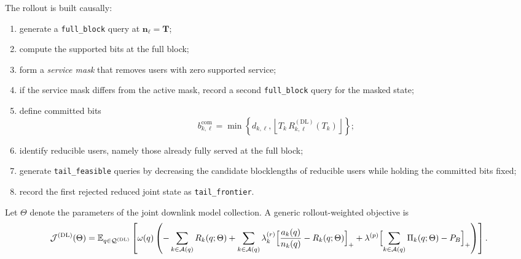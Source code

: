 \documentclass[11pt]{article}
\newcommand{\Aset}{\mathcal{A}}
\newcommand{\Qset}{\mathcal{Q}}
\newcommand{\floor}[1]{\left\lfloor #1 \right\rfloor}
\newcommand{\DL}{\mathrm{DL}}
\newcommand{\E}{\mathbb{E}}
\begin{document}
The rollout is built causally:
\begin{enumerate}
    \item generate a \texttt{full\_block} query at $\mathbf n_\ell=\mathbf T$;
    \item compute the supported bits at the full block;
    \item form a \emph{service mask} that removes users with zero supported service;
    \item if the service mask differs from the active mask, record a second
    \texttt{full\_block} query for the masked state;
    \item define committed bits
    \begin{equation}
    b_{k,\ell}^{\mathrm{com}}
    =
    \min\!\left\{
    d_{k,\ell},
    \floor{T_k\,R_{k,\ell}^{(\DL)}(T_k)}
    \right\};
    \label{eq:dl-committed-bits}
    \end{equation}
    \item identify reducible users, namely those already fully served at the
    full block;
    \item generate \texttt{tail\_feasible} queries by decreasing the candidate
    blocklengths of reducible users while holding the committed bits fixed;
    \item record the first rejected reduced joint state as
    \texttt{tail\_frontier}.
\end{enumerate}

Let $\Theta$ denote the parameters of the joint downlink model collection. A
generic rollout-weighted objective is
\begin{equation}
\mathcal{J}^{(\DL)}(\Theta)
=
\E_{q\in\Qset^{(\DL)}}
\left[
\omega(q)
\left(
-\sum_{k\in\Aset(q)} R_k(q;\Theta)
+
\sum_{k\in\Aset(q)}
\lambda_k^{(r)}
\Bigl[\frac{a_k(q)}{n_k(q)}-R_k(q;\Theta)\Bigr]_+
+
\lambda^{(p)}
\Bigl[
\sum_{k\in\Aset(q)}\Pi_k(q;\Theta)-P_B
\Bigr]_+
\right)
\right].
\label{eq:dl-training-objective}
\end{equation}
\end{document}
